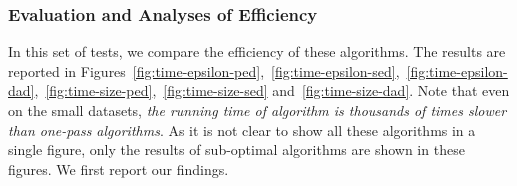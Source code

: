 {%
\subsubsection{Evaluation and Analyses of Efficiency}

In this set of tests, we compare the efficiency of these algorithms.
The results are reported in Figures~\ref{fig:time-epsilon-ped},~\ref{fig:time-epsilon-sed},~\ref{fig:time-epsilon-dad},~\ref{fig:time-size-ped},~\ref{fig:time-size-sed} and~\ref{fig:time-size-dad}.
Note that even on the small datasets, \emph{the running time of algorithm \opt  is thousands of times slower than one-pass algorithms}. As it is not clear to show all these algorithms in a single figure, only the results of sub-optimal algorithms are shown in these figures.
We first report our findings.



}
